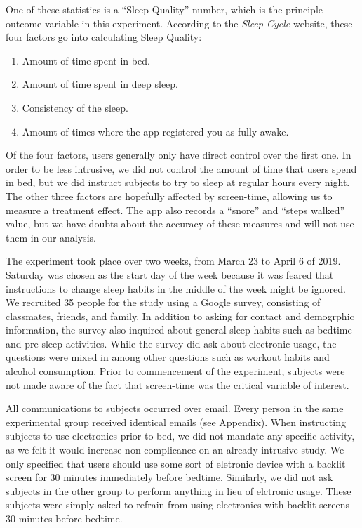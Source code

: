 \documentclass[]{article}
\providecommand{\tightlist}{%
  \setlength{\itemsep}{0pt}\setlength{\parskip}{0pt}}
\begin{document}
One of these statistics is a ``Sleep Quality'' number, which is the
principle outcome variable in this experiment. According to the
\emph{Sleep Cycle} website, these four factors go into calculating Sleep
Quality:

\begin{enumerate}
\def\labelenumi{\arabic{enumi}.}
\tightlist
\item
  Amount of time spent in bed.
\item
  Amount of time spent in deep sleep.
\item
  Consistency of the sleep.
\item
  Amount of times where the app registered you as fully awake.
\end{enumerate}

Of the four factors, users generally only have direct control over the
first one. In order to be less intrusive, we did not control the amount
of time that users spend in bed, but we did instruct subjects to try to
sleep at regular hours every night. The other three factors are
hopefully affected by screen-time, allowing us to measure a treatment
effect. The app also records a ``snore'' and ``steps walked'' value, but
we have doubts about the accuracy of these measures and will not use
them in our analysis.

The experiment took place over two weeks, from March 23 to April 6 of
2019. Saturday was chosen as the start day of the week because it was
feared that instructions to change sleep habits in the middle of the
week might be ignored. We recruited 35 people for the study using a
Google survey, consisting of classmates, friends, and family. In
addition to asking for contact and demogrphic information, the survey
also inquired about general sleep habits such as bedtime and pre-sleep
activities. While the survey did ask about electronic usage, the
questions were mixed in among other questions such as workout habits and
alcohol consumption. Prior to commencement of the experiment, subjects
were not made aware of the fact that screen-time was the critical
variable of interest.

All communications to subjects occurred over email. Every person in the
same experimental group received identical emails (see Appendix). When
instructing subjects to use electronics prior to bed, we did not mandate
any specific activity, as we felt it would increase non-complicance on
an already-intrusive study. We only specified that users should use some
sort of eletronic device with a backlit screen for 30 minutes
immediately before bedtime. Similarly, we did not ask subjects in the
other group to perform anything in lieu of elctronic usage. These
subjects were simply asked to refrain from using electronics with
backlit screens 30 minutes before bedtime.
\end{document}
